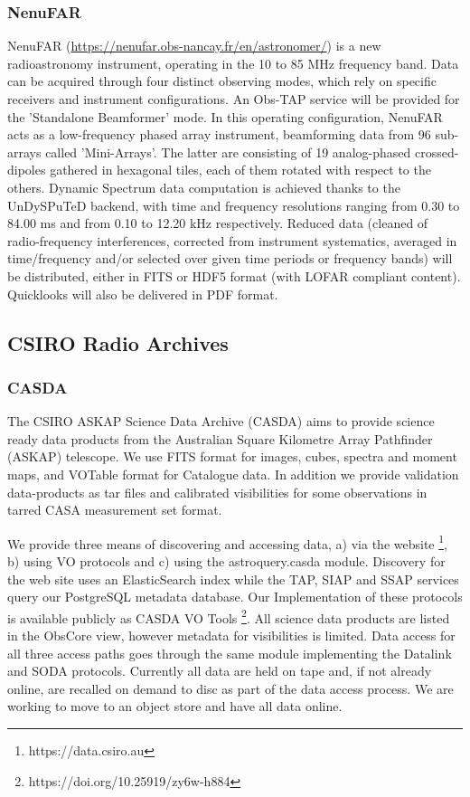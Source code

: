 \documentclass[11pt,a4paper]{ivoa}
\begin{document}
\subsubsection{NenuFAR}
NenuFAR (\url{https://nenufar.obs-nancay.fr/en/astronomer/}) is a new radioastronomy instrument, operating in the 10 to 85 MHz frequency band. Data can be acquired through four distinct observing modes, which rely on specific receivers and instrument configurations. An Obs-TAP service will be provided for the 'Standalone Beamformer' mode. In this operating configuration, NenuFAR acts as a low-frequency phased array instrument, beamforming data from 96 sub-arrays called 'Mini-Arrays'. The latter are consisting of 19 analog-phased crossed-dipoles gathered in hexagonal tiles, each of them rotated with respect to the others. Dynamic Spectrum data computation is achieved thanks to the UnDySPuTeD backend, with time and frequency resolutions ranging from 0.30 to 84.00 ms and from 0.10 to 12.20 kHz respectively. Reduced data (cleaned of radio-frequency interferences, corrected from instrument systematics, averaged in time/frequency and/or selected over given time periods or frequency bands) will be distributed, either in FITS or HDF5 format (with LOFAR compliant content). Quicklooks will also be delivered in PDF format.

\subsection{CSIRO Radio Archives}\label{sec:CASDA}

\subsubsection{CASDA}

The CSIRO ASKAP Science Data Archive (CASDA) aims to provide science ready data products from the Australian Square Kilometre Array Pathfinder (ASKAP) telescope. 
We use FITS format for images, cubes, spectra and moment maps, and VOTable format for Catalogue data. 
In addition we provide validation data-products as tar files and calibrated visibilities for some observations in tarred CASA measurement set format.

We provide three means of discovering and accessing data, a) via the website \footnote{https://data.csiro.au}, b) using VO protocols and c) using the astroquery.casda module. 
Discovery for the web site uses an ElasticSearch index while the TAP, SIAP and SSAP services query our PostgreSQL metadata database. 
Our Implementation of these protocols is available publicly as CASDA VO Tools \footnote{https://doi.org/10.25919/zy6w-h884}.
All science data products are listed in the ObsCore view, however metadata for visibilities is limited. 
Data access for all three access paths goes through the same module implementing the Datalink and SODA protocols. 
Currently all data are held on tape and, if not already online, are recalled on demand to disc as part of the data access process. 
We are working to move to an object store and have all data online.
\end{document}
